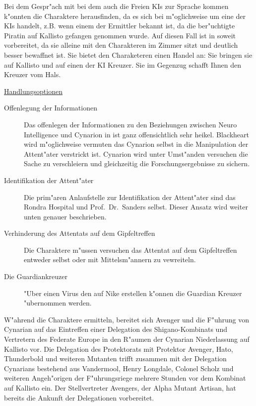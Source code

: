 \underline{\xl{}} Bei dem Gespr"ach mit \ml{} bei dem auch die Freien KIs zur Sprache kommen k"onnten die Charaktere herausfinden, da\3 es sich bei \xl{} m"oglichweise um eine der KIs handelt, z.B. wenn einem der Ermittler bekannt ist, da\3 die ber"uchtigte Piratin auf Kallisto gefangen genommen wurde. Auf diesen Fall ist \xl{} in soweit vorbereitet, da\3 sie alleine mit den Charakteren im Zimmer sitzt und deutlich besser bewaffnet ist. Sie bietet den Charaketeren einen Handel an: Sie bringen sie auf Kallisto und auf einen der KI Kreuzer. Sie im Gegenzug schafft Ihnen den Kreuzer vom Hals.

\underline{Handlungsoptionen}

\begin{description}
	\item[Offenlegung der Informationen] Das offenlegen der Informationen zu den Beziehungen zwischen Neuro Intelligence und Cynarion in 		ist ganz offensichtlich sehr heikel. Blackheart wird m"oglichweise vermuten das Cynarion selbst in die Manipulation der Attent"ater 	verstrickt ist. Cynarion wird unter Umst"anden versuchen die Sache zu verschleiern und gleichzeitig die Forschungsergebnisse zu 		sichern.
	\item[Identifikation der Attent"ater] Die prim"aren Anlaufstelle zur Identifikation der Attent"ater sind das Rondra Hospital und 
		Prof.~Dr.~Sanders selbst. Dieser Ansatz wird weiter unten genauer beschrieben.
	\item[Verhinderung des Attentats auf dem Gipfeltreffen] Die Charaktere m"ussen versuchen das Attentat auf dem Gipfeltreffen entweder selbst oder mit 
		Mittelsm"annern zu vewreiteln.
	\item[Die Guardiankreuzer] "Uber einen Virus den \ml{} auf Nike erstellen k"onnen die Guardian Kreuzer "ubernommen werden.
\end{description}


W"ahrend die Charaktere ermitteln, bereitet sich Avenger und die F"uhrung von Cynarian auf das Eintreffen einer Delegation des Shigano-Kombinats und Vertretern des Federate Europe in den R"aumen der Cynarian Niederlassung auf Kallisto vor. Die Delegation des Protektorats mit Protektor Avenger, Hato, Thunderbold und weiteren Mutanten trifft zusammen mit der Delegation Cynarians bestehend aus Vandermool, Henry Longdale, Colonel Scholz und weiteren Angeh"origen der F"uhrungsriege mehrere Stunden vor dem Kombinat auf Kallisto ein. Der Stellvertreter Avengers, der Alpha Mutant Artisan, hat bereits die Ankunft der Delegationen vorbereitet.

